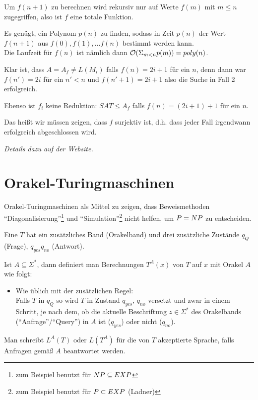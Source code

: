 Um $f(n+1)$ zu berechnen wird rekursiv nur auf Werte $f(m)$ mit $m \leq n$ zugegriffen, also ist $f$ eine totale Funktion.

Es genügt, ein Polynom $p(n)$ zu finden, sodass in Zeit $p(n)$ der Wert $f(n+1)$ aus $f(0), f(1), \dots f(n)$ bestimmt werden kann.\\
Die Laufzeit für $f(n)$ ist nämlich dann $\mathcal{O}(\Sigma_{m < n} p(m)) = poly(n)$.


Klar ist, dass $A = A_f \neq L(M_i)$ falls $f(n) = 2i+1$ für ein $n$, denn dann war $f(n') = 2i$ für ein $n' < n$ und $f(n'+1) = 2i+1$ also die Suche in Fall 2 erfolgreich.

Ebenso ist $f_i$ keine Reduktion: $SAT \leq A_f$ falls $f(n) = (2i+1)+1$ für ein $n$.

Das heißt wir müssen zeigen, dass $f$ surjektiv ist, d.h. dass jeder Fall irgendwann erfolgreich abgeschlossen wird.


\textit{Details dazu auf der Website.}












\section{Orakel-Turingmaschinen}


Orakel-Turingmaschinen als Mittel zu zeigen, dass Beweismethoden ``Diagonalisierung''\footnote{zum Beispiel benutzt für $NP \subseteq EXP$} und ``Simulation''\footnote{zum Beispiel benutzt für $P \subset EXP$ (Ladner)} nicht helfen, um $P = NP$ zu entscheiden.



\begin{definition}
    
    Eine  $T$ hat ein zusätzliches Band (Orakelband) und drei zusätzliche Zustände $q_Q$ (Frage), $q_{yes} q_{no}$ (Antwort).

    Ist $A \subseteq \Sigma^\ast$, dann definiert man Berechnungen $T^A(x)$ von $T$ auf $x$ mit Orakel $A$ wie folgt:
    \begin{itemize}
        \item Wie üblich mit der zusätzlichen Regel:\\
            Falls $T$ in $q_Q$ so wird $T$ in Zustand $q_{yes}$, $q_{no}$ versetzt und zwar in einem Schritt, je nach dem, ob die aktuelle Beschriftung $z \in \Sigma^\ast$ des Orakelbands (``Anfrage''/``Query'') in $A$ ist ($q_{yes}$) oder nicht ($q_{no}$).
    \end{itemize}
    Man schreibt $L^A(T)$ oder $L(T^A)$ für die von $T$ akzeptierte Sprache, falls Anfragen gemäß $A$ beantwortet werden.

\end{definition}




